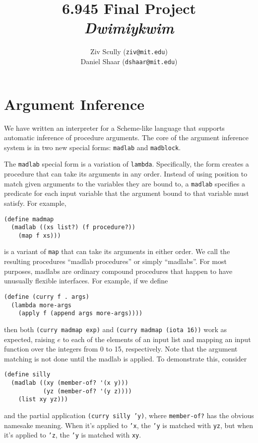 \documentclass[11pt]{article}
\title{\vspace{-0.5in} 6.945 Final Project \\ \emph{Dwimiykwim}}
\author{Ziv Scully (\texttt{ziv@mit.edu}) \\
  Daniel Shaar (\texttt{dshaar@mit.edu})}
\date{}
\begin{document}
\maketitle

\renewcommand{\~}{\textasciitilde}


\section{Argument Inference}

We have written an interpreter for a Scheme-like language
that supports automatic inference of procedure arguments.
The core of the argument inference system is in two new special forms:
\texttt{madlab} and \texttt{madblock}.

The \texttt{madlab} special form is a variation of \texttt{lambda}.
Specifically, the form creates a procedure
that can take its arguments in any order.
Instead of using position to match given arguments
to the variables they are bound to,
a \texttt{madlab} specifies a predicate for each input variable
that the argument bound to that variable must satisfy.
For example,
\begin{Verbatim}
(define madmap
  (madlab ((xs list?) (f procedure?))
    (map f xs)))
\end{Verbatim}
is a variant of \texttt{map} that can take its arguments in either order.
We call the resulting procedures ``madlab procedures'' or simply ``madlabs''.
For most purposes, madlabs are ordinary compound procedures
that happen to have unusually flexible interfaces.
For example, if we define
\begin{Verbatim}
(define (curry f . args)
  (lambda more-args
    (apply f (append args more-args))))
\end{Verbatim}
then both \texttt{(curry madmap exp)} and
\texttt{(curry madmap (iota 16))} work as expected,
raising $e$ to each of the elements of an input list
and mapping an input function over the integers from 0 to 15, respectively.
Note that the argument matching is not done until the madlab is applied.
To demonstrate this, consider
\begin{Verbatim}
(define silly
  (madlab ((xy (member-of? '(x y)))
           (yz (member-of? '(y z))))
    (list xy yz)))
\end{Verbatim}
and the partial application \texttt{(curry silly 'y)},
where \texttt{member-of?} has the obvious namesake meaning.
When it's applied to \texttt{'x},
the \texttt{'y} is matched with \texttt{yz},
but when it's applied to \texttt{'z},
the \texttt{'y} is matched with \texttt{xy}.
\end{document}
